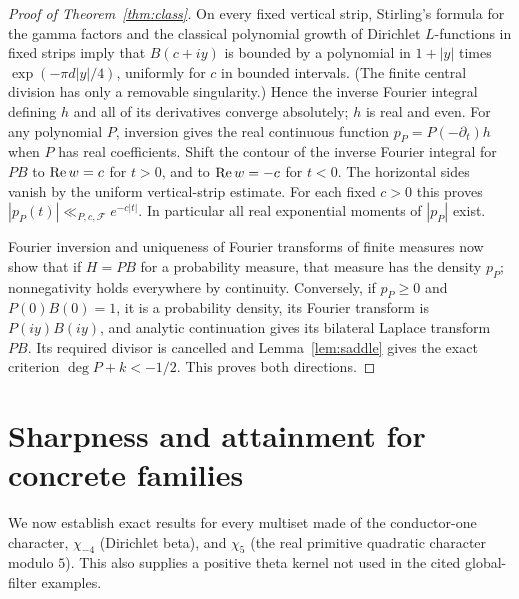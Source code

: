 \documentclass[11pt]{article}
\theoremstyle{remark}\newtheorem{remark}[theorem]{Remark}
\newcommand{\F}{\mathcal F}\newcommand{\dd}{\,\mathrm d}
\begin{document}
\begin{proof}[Proof of Theorem~\ref{thm:class}]
On every fixed vertical strip, Stirling's formula for the gamma factors and the classical polynomial growth of Dirichlet $L$-functions in fixed strips imply that $B(c+iy)$ is bounded by a polynomial in $1+|y|$ times $\exp(-\pi d|y|/4)$, uniformly for $c$ in bounded intervals. (The finite central division has only a removable singularity.) Hence the inverse Fourier integral defining $h$ and all of its derivatives converge absolutely; $h$ is real and even. For any polynomial $P$, inversion gives the real continuous function $p_P=P(-\partial_t)h$ when $P$ has real coefficients. Shift the contour of the inverse Fourier integral for $PB$ to $\operatorname{Re} w=c$ for $t>0$, and to $\operatorname{Re} w=-c$ for $t<0$. The horizontal sides vanish by the uniform vertical-strip estimate. For each fixed $c>0$ this proves $|p_P(t)|\ll_{P,c,\F}e^{-c|t|}$. In particular all real exponential moments of $|p_P|$ exist.

Fourier inversion and uniqueness of Fourier transforms of finite measures now show that if $H=PB$ for a probability measure, that measure has the density $p_P$; nonnegativity holds everywhere by continuity. Conversely, if $p_P\ge0$ and $P(0)B(0)=1$, it is a probability density, its Fourier transform is $P(iy)B(iy)$, and analytic continuation gives its bilateral Laplace transform $PB$. Its required divisor is cancelled and Lemma~\ref{lem:saddle} gives the exact criterion $\deg P+k<-1/2$. This proves both directions.
\end{proof}

\section{Sharpness and attainment for concrete families}\label{sec:examples}
We now establish exact results for every multiset made of the conductor-one character, $\chi_{-4}$ (Dirichlet beta), and $\chi_5$ (the real primitive quadratic character modulo $5$). This also supplies a positive theta kernel not used in the cited global-filter examples.
\end{document}
